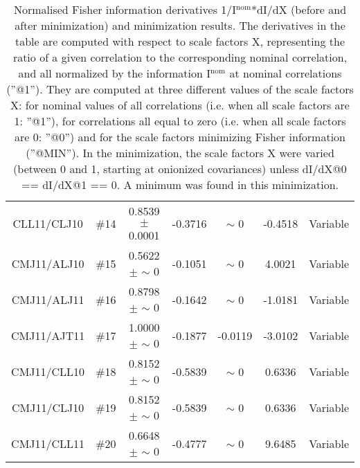 \begin{table}[H]
\begin{center}
\begin{tabular}{|c|c|c|ccc|c|}
 {\tiny CLL11/CLJ10} & \#14 &    0.8539 $\pm$    0.0001 &   -0.3716 & {\tiny $\sim$ }0 &   -0.4518 & Variable \\
 {\tiny CMJ11/ALJ10} & \#15 &    0.5622 $\pm$ {\tiny $\sim$ }0 &   -0.1051 & {\tiny $\sim$ }0 &    4.0021 & Variable \\
 {\tiny CMJ11/ALJ11} & \#16 &    0.8798 $\pm$ {\tiny $\sim$ }0 &   -0.1642 & {\tiny $\sim$ }0 &   -1.0181 & Variable \\
 {\tiny CMJ11/AJT11} & \#17 &    1.0000 $\pm$ {\tiny $\sim$ }0 &   -0.1877 &   -0.0119 &   -3.0102 & Variable \\
 {\tiny CMJ11/CLL10} & \#18 &    0.8152 $\pm$ {\tiny $\sim$ }0 &   -0.5839 & {\tiny $\sim$ }0 &    0.6336 & Variable \\
 {\tiny CMJ11/CLJ10} & \#19 &    0.8152 $\pm$ {\tiny $\sim$ }0 &   -0.5839 & {\tiny $\sim$ }0 &    0.6336 & Variable \\
 {\tiny CMJ11/CLL11} & \#20 &    0.6648 $\pm$ {\tiny $\sim$ }0 &   -0.4777 & {\tiny $\sim$ }0 &    9.6485 & Variable \\
\hline
\end{tabular}
\renewcommand{\arraystretch}{1}
\caption{Normalised Fisher information derivatives 1/I$^\mathrm{nom}$*dI/dX (before and after minimization) and minimization results.  The derivatives in the table are computed with respect to scale factors X, representing the ratio of a given correlation to the corresponding nominal correlation, and all normalized by the information I$^\mathrm{nom}$ at nominal correlations (''@1''). They are computed at three different values of the scale factors X: for nominal values of all correlations (i.e. when all scale factors are 1: ''@1''), for correlations all equal to zero (i.e. when all scale factors are 0: ''@0'') and for the scale factors minimizing Fisher information (''@MIN''). In the minimization, the scale factors X were varied (between 0 and 1, starting at onionized covariances) unless dI/dX@0 == dI/dX@1 == 0. A minimum was found in this minimization.}
\end{center}
\end{table}
